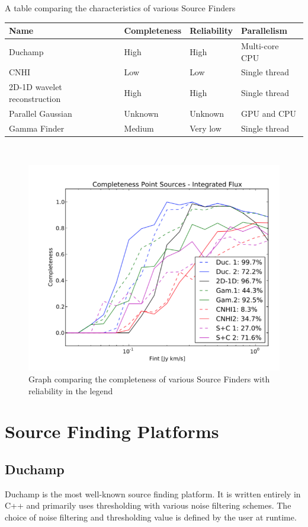 \documentclass[prodmode,acmtecs]{acmsmall} \usepackage[ruled]{algorithm2e}
\begin{document}
\begin{center}A table comparing the characteristics of various Source Finders \cite{popping2012comparison} \end{center}
    \begin{tabular}{|l | l | l | l | }
    \hline
    Name  & Completeness & Reliability & Parallelism \\
    \hline
    \hline
    Duchamp  & High & High & Multi-core CPU \\
    \hline
    CNHI  & Low & Low & Single thread \\
    \hline
    2D-1D wavelet reconstruction & High & High & Single thread \\
    \hline
    Parallel Gaussian  & Unknown & Unknown & GPU and CPU \\
    \hline
      Gamma Finder & Medium & Very low & Single thread \\
    \end{tabular}
    \\
\begin{figure}
  \includegraphics{comparisoncompleteness}
  \caption{Graph comparing the completeness of various Source Finders with reliability in the legend}
\end{figure}
\section{Source Finding Platforms}
    \subsection{Duchamp}
Duchamp is the most well-known source finding platform. It is written entirely in C++ and primarily uses
thresholding with various noise filtering schemes. The choice of noise filtering and thresholding
value is defined by the user at runtime.  
        \cite{whiting2012duchamp}
\end{document}
